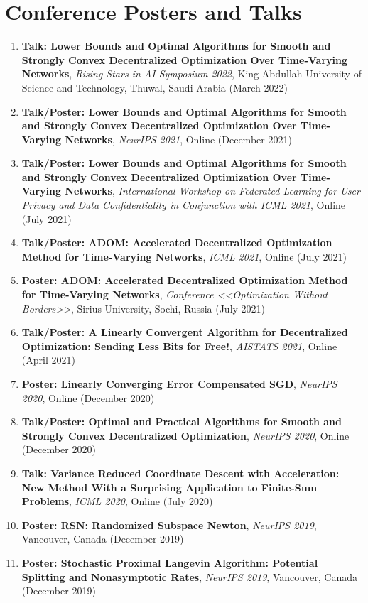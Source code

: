\section{Conference Posters and Talks}
\begin{enumerate}
\item {\bf Talk: Lower Bounds and Optimal Algorithms for Smooth and Strongly Convex Decentralized Optimization Over Time-Varying Networks}, {\em Rising Stars in AI Symposium 2022}, King Abdullah University of Science and Technology, Thuwal, Saudi Arabia (March 2022)
\item {\bf Talk/Poster: Lower Bounds and Optimal Algorithms for Smooth and Strongly Convex Decentralized Optimization Over Time-Varying Networks}, {\em NeurIPS 2021}, Online (December 2021)
\item {\bf Talk/Poster: Lower Bounds and Optimal Algorithms for Smooth and Strongly Convex Decentralized Optimization Over Time-Varying Networks}, {\em International Workshop on Federated Learning for User Privacy and Data Confidentiality in Conjunction with ICML 2021}, Online (July 2021)
\item {\bf Talk/Poster: ADOM: Accelerated Decentralized Optimization Method for Time-Varying Networks}, {\em ICML 2021}, Online (July 2021)
\item {\bf Poster: ADOM: Accelerated Decentralized Optimization Method for Time-Varying Networks}, {\em Conference <<Optimization Without Borders>>}, Sirius University, Sochi, Russia (July 2021)
\item {\bf Talk/Poster: A Linearly Convergent Algorithm for Decentralized Optimization: Sending Less Bits for Free!}, {\em AISTATS 2021}, Online (April 2021)
\item {\bf Poster: Linearly Converging Error Compensated SGD}, {\em NeurIPS 2020}, Online (December 2020)
\item {\bf Talk/Poster: Optimal and Practical Algorithms for Smooth and Strongly Convex Decentralized Optimization}, {\em NeurIPS 2020}, Online (December 2020)
\item {\bf Talk: Variance Reduced Coordinate Descent with Acceleration: New Method With a Surprising Application to Finite-Sum Problems}, {\em ICML 2020}, Online (July 2020)
\item {\bf Poster: RSN: Randomized Subspace Newton}, {\em NeurIPS 2019}, Vancouver, Canada (December 2019)
\item {\bf Poster: Stochastic Proximal Langevin Algorithm: Potential Splitting and Nonasymptotic Rates}, {\em NeurIPS 2019}, Vancouver, Canada (December 2019)

\end{enumerate}
